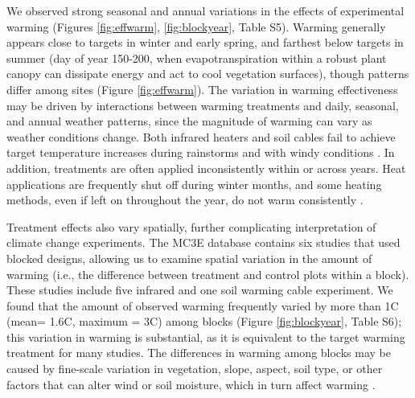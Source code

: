 \documentclass{article}
\begin{document}
\par We observed strong seasonal and annual variations in the effects of experimental warming (Figures \ref{fig:effwarm}, \ref{fig:blockyear}, Table S5). Warming generally appears close to targets in winter and early spring, and farthest below targets in summer (day of year 150-200, when evapotranspiration within a robust plant canopy can dissipate energy and act to cool vegetation surfaces), though patterns differ among sites (Figure \ref{fig:effwarm}). 
The variation in warming effectiveness may be driven by interactions between warming treatments and daily, seasonal, and annual weather patterns, since the magnitude of warming can vary as weather conditions change. Both infrared heaters and soil cables fail to achieve target temperature increases during rainstorms \citep{peterjohn1993,hoeppner2012} and with windy conditions \citep{kimball2005,kimball2008}. In addition, treatments are often applied inconsistently within or across years. Heat applications are frequently shut off during winter months, and some heating methods, even if left on throughout the year, do not warm consistently \citep[e.g.,][]{clark2014a,clark2014b,hagedorn2010}.

\par Treatment effects also vary spatially, further complicating interpretation of climate change experiments. The MC3E database contains six studies that used blocked designs, allowing us to examine spatial variation in the amount of warming (i.e., the difference between treatment and control plots within a block). These studies include five infrared and one soil warming cable experiment. We found that the amount of observed warming frequently varied by more than 1\degree C (mean= 1.6\degree C, maximum = 3\degree C) among blocks (Figure \ref{fig:blockyear}, Table S6); this variation in warming is substantial, as it is equivalent to the target warming treatment for many studies. %
 The differences in warming among blocks may be caused by fine-scale variation in vegetation, slope, aspect, soil type, or other factors that can alter wind or soil moisture, which in turn affect warming \citep{peterjohn1993,kimball2005,kimball2008,hoeppner2012,rollinson2015}. %
\end{document}
